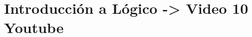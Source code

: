 \documentclass[11pt,a4paper]{article}
\begin{document}
\pagestyle{fancy}
\lhead{\sc }
\chead{}
\rhead{\rightmark}
\lfoot{}
\cfoot{}
\rfoot{\thepage}

%




\newpage

\section{Introducción a Lógico -> Video 10 Youtube}
 


\newpage

\appendix

%
%
%
\end{document}
